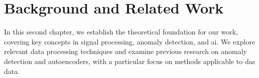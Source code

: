 \chapter{Background and Related Work}
\label{chap:back}

In this second chapter, we establish the theoretical foundation for our work, covering key concepts in signal processing, anomaly detection, and \acrshort{ai}. We explore relevant data processing techniques and examine previous research on anomaly detection and autoencoders, with a particular focus on methods applicable to \acrshort{das} data.








